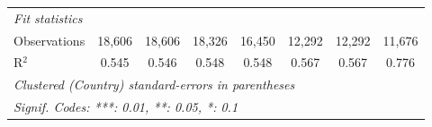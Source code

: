 \begin{tabular}{lccccccc}
   \midrule \emph{Fit statistics}\\
   Observations                                                      & 18,606        & 18,606        & 18,326        & 16,450         & 12,292         & 12,292         & 11,676\\  
   R$^2$                                                             & 0.545         & 0.546         & 0.548         & 0.548          & 0.567          & 0.567          & 0.776\\  
   \midrule
   \multicolumn{8}{l}{\emph{Clustered (Country) standard-errors in parentheses}}\\
   \multicolumn{8}{l}{\emph{Signif. Codes: ***: 0.01, **: 0.05, *: 0.1}}\\
\end{tabular}
\par\endgroup


